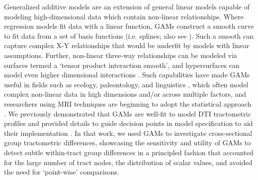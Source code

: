 \documentclass[12pt]{article}
\begin{document}
Generalized additive models \parencite[GAMs;][]{wood2017GeneralizedAdditiveModels,pedersen2019HierarchicalGeneralizedAdditive,stasinopoulos2008GeneralizedAdditiveModels} are an extension of general linear models capable of modeling high-dimensional data which contain non-linear relationships. Where regression models fit data with a linear function, GAMs construct a smooth curve to fit data from a set of basis functions (i.e. splines; also see \textcite{verbyla1999AnalysisDesignedExperiments}). Such a smooth can capture complex X-Y relationships that would be underfit by models with linear assumptions. Further, non-linear three-way relationships can be modeled via surfaces termed a `tensor product interaction smooth', and hypersurfaces can model even higher dimensional interactions \parencite{baayen2020IntroductionGeneralizedAdditive}. Such capabilities have made GAMs useful in fields such as ecology, paleontology, and linguistics \parencite[e.g.][]{simpson2018ModellingPalaeoecologicalTime,pedersen2019HierarchicalGeneralizedAdditive,schmidt2011SpatiallyExplicitHeight,wieling2011QuantitativeSocialDialectology,simpson2018ModellingPalaeoecologicalTime,wieling2018AnalyzingDynamicPhonetic,murase2009ApplicationGeneralizedAdditive,vanrij2019AnalyzingTimeCourse}, which often model complex non-linear data in high dimensions and/or across multiple factors, and researchers using MRI techniques are beginning to adopt the statistical approach \parencite[e.g.][]{lee2025AtypicalMaturationFunctional,xu2025AgeBSASexspecific,wierenga2018UnravelingAgePuberty,mundo2022GeneralizedAdditiveModels,roy2025DevelopmentArcuateFasciculus,sorensen2021MetaanalysisGeneralizedAdditive,caffarra2024DevelopmentAlphaRhythm}. We previously demonstrated that GAMs are well-fit to model DTI tractometric profiles and provided details to guide decision points in model specification to aid their implementation \parencite{muncy2022GeneralAdditiveModels}. In that work, we used GAMs to investigate cross-sectional group tractometric differences, showcasing the sensitivity and utility of GAMs to detect subtle within-tract group differences in a principled fashion that accounted for the large number of tract nodes, the distribution of scalar values, and avoided the need for `point-wise' comparisons.
\end{document}
